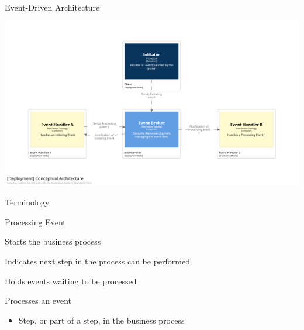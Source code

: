 \documentclass{slide}
\begin{document}
\begin{frame}{Event-Driven Architecture}
    \begin{adjustwidth}{-10mm}{-10mm}
        \centering
        \includegraphics[trim=195 230 195 162,clip,width=0.97\paperwidth]{../../notes/event/diagrams/conceptual-architecture.png}
    \end{adjustwidth}
\end{frame}

\begin{frame}{Terminology}
    \vspace{1mm}
    {\LARGE
    \begin{labeling}{Processing Event}
        \item<1->[\color{secondary} Initiating Event] Starts the business process
        \vspace{3mm}
        \item<2->[\color{secondary} Processing Event] Indicates next step in the process can be performed
        \vspace{3mm}
        \item<3->[\color{secondary} Event Channel] Holds events waiting to be processed
        \vspace{3mm}
        \item<4->[\color{secondary} Event Handler] Processes an event
        \begin{itemize}
            \Large\item Step, or part of a step, in the business process
        \end{itemize}
    \end{labeling}
    }
\end{frame}
\end{document}
